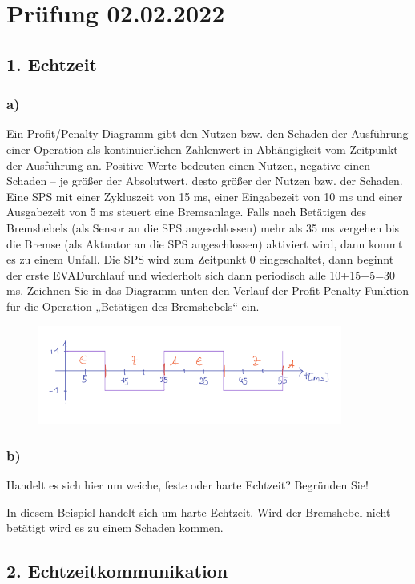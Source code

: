 \section{Prüfung 02.02.2022}

\subsection{1. Echtzeit}
\subsubsection{a)}
Ein Profit/Penalty-Diagramm gibt den Nutzen bzw. den Schaden der Ausführung einer Operation als
kontinuierlichen Zahlenwert in Abhängigkeit vom Zeitpunkt der Ausführung an. Positive Werte
bedeuten einen Nutzen, negative einen Schaden – je größer der Absolutwert, desto größer der Nutzen
bzw. der Schaden.
Eine SPS mit einer Zykluszeit von 15 ms, einer Eingabezeit von 10 ms und einer Ausgabezeit von 5 ms
steuert eine Bremsanlage. Falls nach Betätigen des Bremshebels (als Sensor an die SPS angeschlossen)
mehr als 35 ms vergehen bis die Bremse (als Aktuator an die SPS angeschlossen) aktiviert wird, dann
kommt es zu einem Unfall. Die SPS wird zum Zeitpunkt 0 eingeschaltet, dann beginnt der erste EVADurchlauf und wiederholt sich dann periodisch alle 10+15+5=30 ms.
Zeichnen Sie in das Diagramm unten den Verlauf der Profit-Penalty-Funktion für die Operation
„Betätigen des Bremshebels“ ein.

\begin{figure}
  \includegraphics[width=10cm]{images/KA020222/1a.PNG}
  \centering
\end{figure}

\subsubsection{b)}
Handelt es sich hier um weiche, feste oder harte Echtzeit? Begründen Sie!

In diesem Beispiel handelt sich um harte Echtzeit. Wird der Bremshebel nicht betätigt wird es zu einem Schaden kommen.

\subsection{2. Echtzeitkommunikation}
